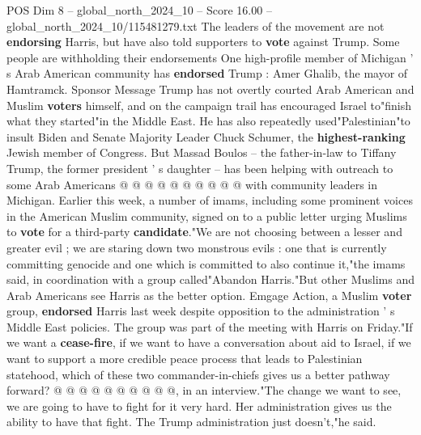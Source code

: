 \begin{textsample}{POS Dim 8 – global\_north\_2024\_10 – Score 16.00 – global\_north\_2024\_10/115481279.txt}
The leaders of the movement are not \textbf{endorsing} Harris, but have also told supporters to \textbf{vote} against Trump.
Some people are withholding their endorsements One high-profile member of Michigan ' s Arab American community has \textbf{endorsed} Trump : Amer Ghalib, the mayor of Hamtramck.
Sponsor Message Trump has not overtly courted Arab American and Muslim \textbf{voters} himself, and on the campaign trail has encouraged Israel to"finish what they started"in the Middle East.
He has also repeatedly used"Palestinian"to insult Biden and Senate Majority Leader Chuck Schumer, the \textbf{highest-ranking} Jewish member of Congress.
But Massad Boulos -- the father-in-law to Tiffany Trump, the former president ' s daughter -- has been helping with outreach to some Arab Americans @ @ @ @ @ @ @ @ @ @ with community leaders in Michigan.
Earlier this week, a number of imams, including some prominent voices in the American Muslim community, signed on to a public letter urging Muslims to \textbf{vote} for a third-party \textbf{candidate}."We are not choosing between a lesser and greater evil ; we are staring down two monstrous evils : one that is currently committing genocide and one which is committed to also continue it,"the imams said, in coordination with a group called"Abandon Harris."But other Muslims and Arab Americans see Harris as the better option.
Emgage Action, a Muslim \textbf{voter} group, \textbf{endorsed} Harris last week despite opposition to the administration ' s Middle East policies.
The group was part of the meeting with Harris on Friday."If we want a \textbf{cease-fire}, if we want to have a conversation about aid to Israel, if we want to support a more credible peace process that leads to Palestinian statehood, which of these two commander-in-chiefs gives us a better pathway forward? @ @ @ @ @ @ @ @ @ @, in an interview."The change we want to see, we are going to have to fight for it very hard.
Her administration gives us the ability to have that fight.
The Trump administration just doesn't,"he said.

\end{textsample}
